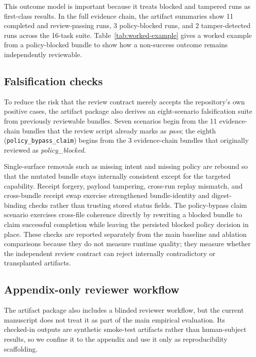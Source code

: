 This outcome model is important because it treats blocked and tampered runs as first-class results. In the full evidence chain, the artifact summaries show 11 completed and review-passing runs, 3 policy-blocked runs, and 2 tamper-detected runs across the 16-task suite. Table~\ref{tab:worked-example} gives a worked example from a policy-blocked bundle to show how a non-success outcome remains independently reviewable.



\subsection{Falsification checks}

To reduce the risk that the review contract merely accepts the repository's own positive cases, the artifact package also derives an eight-scenario falsification suite from previously reviewable bundles. Seven scenarios begin from the 11 evidence-chain bundles that the review script already marks as \emph{pass}; the eighth (\texttt{policy\_bypass\_claim}) begins from the 3 evidence-chain bundles that originally reviewed as \emph{policy\_blocked}.

Single-surface removals such as missing intent and missing policy are rebound so that the mutated bundle stays internally consistent except for the targeted capability. Receipt forgery, payload tampering, cross-run replay mismatch, and cross-bundle receipt swap exercise strengthened bundle-identity and digest-binding checks rather than trusting stored status fields. The policy-bypass claim scenario exercises cross-file coherence directly by rewriting a blocked bundle to claim successful completion while leaving the persisted blocked policy decision in place. These checks are reported separately from the main baseline and ablation comparisons because they do not measure runtime quality; they measure whether the independent review contract can reject internally contradictory or transplanted artifacts.

\subsection{Appendix-only reviewer workflow}

The artifact package also includes a blinded reviewer workflow, but the current manuscript does not treat it as part of the main empirical evaluation. Its checked-in outputs are synthetic smoke-test artifacts rather than human-subject results, so we confine it to the appendix and use it only as reproducibility scaffolding.


